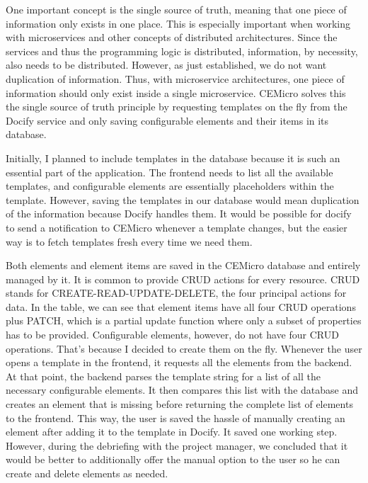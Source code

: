 One important concept is the single source of truth, meaning that one piece of information only exists in one place. This is especially important when working with microservices and other concepts of distributed architectures. Since the services and thus the programming logic is distributed, information, by necessity, also needs to be distributed. However, as just established, we do not want duplication of information. Thus, with microservice architectures, one piece of information should only exist inside a single microservice. CEMicro solves this the single source of truth principle by requesting templates on the fly from the Docify service and only saving configurable elements and their items in its database.

Initially, I planned to include templates in the database because it is such an essential part of the application. The frontend needs to list all the available templates, and configurable elements are essentially placeholders within the template. However, saving the templates in our database would mean duplication of the information because Docify handles them. It would be possible for docify to send a notification to CEMicro whenever a template changes, but the easier way is to fetch templates fresh every time we need them.

Both elements and element items are saved in the CEMicro database and entirely managed by it. It is common to provide CRUD actions for every resource. CRUD stands for CREATE-READ-UPDATE-DELETE, the four principal actions for data. In the table, we can see that element items have all four CRUD operations plus PATCH, which is a partial update function where only a subset of properties has to be provided. Configurable elements, however, do not have four CRUD operations. That's because I decided to create them on the fly. Whenever the user opens a template in the frontend, it requests all the elements from the backend. At that point, the backend parses the template string for a list of all the necessary configurable elements. It then compares this list with the database and creates an element that is missing before returning the complete list of elements to the frontend. This way, the user is saved the hassle of manually creating an element after adding it to the template in Docify. It saved one working step. However, during the debriefing with the project manager, we concluded that it would be better to additionally offer the manual option to the user so he can create and delete elements as needed.

